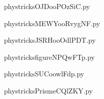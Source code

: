     \newcommand{\CaptionFigOJDooPOzSiC}{<+Type your caption here+>}
    \begin{center}
        
    \end{center}
    phystricksOJDooPOzSiC.py

    

    \clearpage
    


    \newcommand{\CaptionFigMEWYooRvygNF}{<+Type your caption here+>}
    \begin{center}
        
    \end{center}
    phystricksMEWYooRvygNF.py

    

    \clearpage
    


    \newcommand{\CaptionFigJSRHooOdlPDT}{<+Type your caption here+>}
    \begin{center}
        
    \end{center}
    phystricksJSRHooOdlPDT.py

    

    \clearpage
    


    \newcommand{\CaptionFigfigureNPQwFTp}{<+Type your caption here+>}
    \begin{center}
        
    \end{center}
    phystricksfigureNPQwFTp.py

    

    \clearpage
    


    \newcommand{\CaptionFigSUCoowlFdp}{<+Type your caption here+>}
    \begin{center}
        
    \end{center}
    phystricksSUCoowlFdp.py

    

    \clearpage
    


    \newcommand{\CaptionFigPrismeCQlZKY}{<+Type your caption here+>}
    \begin{center}
        
    \end{center}
    phystricksPrismeCQlZKY.py

